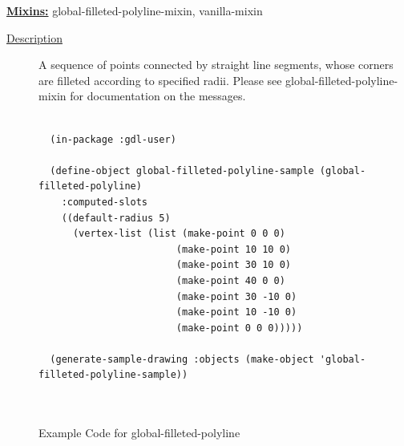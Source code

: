 \documentclass [11pt]{book}
\begin{document}
\begin{itemize}
\textbf{
\underline{Mixins:}} global-filleted-polyline-mixin, vanilla-mixin





\begin{description}

\item [
\underline{Description}]


A sequence of points connected by straight line segments, whose
corners are filleted according to specified radii. Please see global-filleted-polyline-mixin
for documentation on the messages.



\end{description}




\begin{figure}
\begin{lrbox}{\boxedverb}
\begin{minipage}{\linewidth}
{\small

\begin{verbatim}

  (in-package :gdl-user)

  (define-object global-filleted-polyline-sample (global-filleted-polyline)
    :computed-slots
    ((default-radius 5)
      (vertex-list (list (make-point 0 0 0)
                        (make-point 10 10 0)
                        (make-point 30 10 0)
                        (make-point 40 0 0)
                        (make-point 30 -10 0)
                        (make-point 10 -10 0)
                        (make-point 0 0 0)))))

  (generate-sample-drawing :objects (make-object 'global-filleted-polyline-sample))

  
\end{verbatim}}
\end{minipage}
\end{lrbox}
\fbox{\usebox{\boxedverb}}

\caption{Example Code for global-filleted-polyline}

\label{fig:example-code-global-filleted-polyline}

\end{figure}


\end{itemize}
\end{document}
